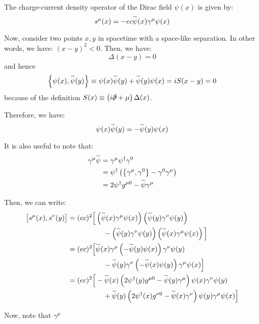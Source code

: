 \documentclass[letterpaper,12pt]{article}
\newenvironment{problem}{\subsection{}\begin{adjustwidth}{0.25in}{}\vspace{-\baselineskip}}{\end{adjustwidth}}
\newcommand{\define}{\equiv}
\newcommand{\overbar}[1]{
	\mkern 1.5mu \overline{\mkern-1.5mu\raisebox{0pt}[\dimexpr\height+0.5mm\relax]{$#1$}\mkern-1.5mu}\mkern 1.5mu
}
\begin{document}
\begin{problem}
The charge-current density operator of the Dirac field $\psi(x)$ is given by:
\begin{equation*}
	s^\mu (x) = -ec \overbar{\psi}(x) \gamma^\mu \psi(x)
\end{equation*}

Now, consider two points $x,y$ in spacetime with a space-like separation. In other words, we have: $(x-y)^2 < 0$. Then, we have:
\begin{equation*}
	\Delta(x-y) = 0
\end{equation*}
and hence
\begin{equation*}
	\left\{\psi(x), \overbar{\psi}(y)\right\} \define \psi(x)\overbar{\psi}(y) + \overbar{\psi}(y)\psi(x) = iS(x-y) = 0
\end{equation*}
because of the definition $S(x) \define \left(i\slashed{\partial} + \mu\right)\Delta(x)$.

Therefore, we have:
\begin{equation*}
	\psi(x)\overbar{\psi}(y) = -\overbar{\psi}(y)\psi(x)
\end{equation*}

It is also useful to note that:
\begin{align*}
	\gamma^\mu \overbar{\psi} &= \gamma^\mu \psi^\dagger \gamma^0	\\
	&= \psi^\dagger \left(\big\{\gamma^\mu, \gamma^0\big\} - \gamma^0\gamma^\mu\right)	\\
	&= 2\psi^\dagger g^{\mu 0} - \overbar{\psi} \gamma^\mu
\end{align*}

Then, we can write:
\begin{align*}
	\big[s^\mu(x), s^\nu(y)\big]
	&= (ec)^2 \Big[ \left(\overbar{\psi}(x)\gamma^\mu\psi(x)\right)\left(\overbar{\psi}(y)\gamma^\nu\psi(y)\right)	\\
	& \hspace{5em} - \left(\overbar{\psi}(y)\gamma^\nu\psi(y)\right) \left(\overbar{\psi}(x)\gamma^\mu\psi(x)\right) \Big]	\\
	&= (ec)^2 \Big[ \overbar{\psi}(x)\gamma^\mu \left(-\overbar{\psi}(y)\psi(x)\right) \gamma^\nu\psi(y)	\\
	& \hspace{5em} - \overbar{\psi}(y)\gamma^\nu \left(-\overbar{\psi}(x)\psi(y)\right) \gamma^\mu\psi(x) \Big]	\\
	&= (ec)^2 \Big[-\overbar{\psi}(x)\left(2\psi^\dagger(y)g^{\mu 0} - \overbar{\psi}(y)\gamma^\mu\right)\psi(x)\gamma^\nu\psi(y)	\\
	& \hspace{5em} + \overbar{\psi}(y)\left(2	\psi^\dagger(x)g^{\nu 0} - \overbar{\psi}(x)\gamma^\nu\right)\psi(y)\gamma^\mu\psi(x)	\Big]
\end{align*}

Now, note that $\gamma^\mu$

\end{problem}
\end{document}
